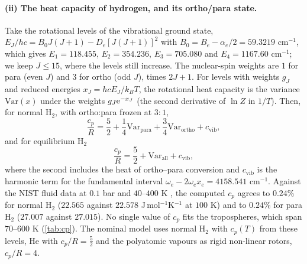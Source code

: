 \documentclass[11pt]{article}
\theoremstyle{definition}\newtheorem{definition}[theorem]{Definition}
\theoremstyle{remark}\newtheorem{remark}[theorem]{Remark}
\begin{document}
\paragraph{(ii) The heat capacity of hydrogen, and its ortho/para state.} Take the rotational levels of the vibrational ground state, $E_J/hc=B_0J(J+1)-D_e[J(J+1)]^2$ with $B_0=B_e-\alpha_e/2=59.3219$ cm$^{-1}$, which gives $E_1=118.455$, $E_2=354.236$, $E_3=705.080$ and $E_4=1167.60$ cm$^{-1}$; we keep $J\le15$, where the levels still increase. The nuclear-spin weights are $1$ for para (even $J$) and $3$ for ortho (odd $J$), times $2J+1$. For levels with weights $g_J$ and reduced energies $x_J=hcE_J/k_BT$, the rotational heat capacity is the variance $\mathrm{Var}(x)$ under the weights $g_J\mathrm e^{-x_J}$ (the second derivative of $\ln Z$ in $1/T$). Then,
for normal H$_2$, with ortho:para frozen at $3{:}1$,
\[
\frac{c_p}R=\frac52+\frac14\mathrm{Var}_\mathrm{para}+\frac34\mathrm{Var}_\mathrm{ortho}+c_\mathrm{vib},
\]
and for equilibrium H$_2$
\[
\frac{c_p}R=\frac52+\mathrm{Var}_\mathrm{all}+c_\mathrm{vib},
\]
where the second includes the heat of ortho--para conversion and $c_\mathrm{vib}$ is the harmonic term for the fundamental interval $\omega_e-2\omega_ex_e=4158.541$ cm$^{-1}$. Against the NIST fluid data at $0.1$ bar and $40$--$400$ K \cite{Leachman}, the computed $c_p$ agrees to $0.24\%$ for normal H$_2$ ($22.565$ against $22.578$ J\,mol$^{-1}$K$^{-1}$ at $100$ K) and to $0.24\%$ for para H$_2$ ($27.007$ against $27.015$). No single value of $c_p$ fits the tropospheres, which span $70$--$600$ K (\cref{tab:cp}). The nominal model uses normal H$_2$ with $c_p(T)$ from these levels, He with $c_p/R=\frac52$ and the polyatomic vapours as rigid non-linear rotors, $c_p/R=4$.
\end{document}
